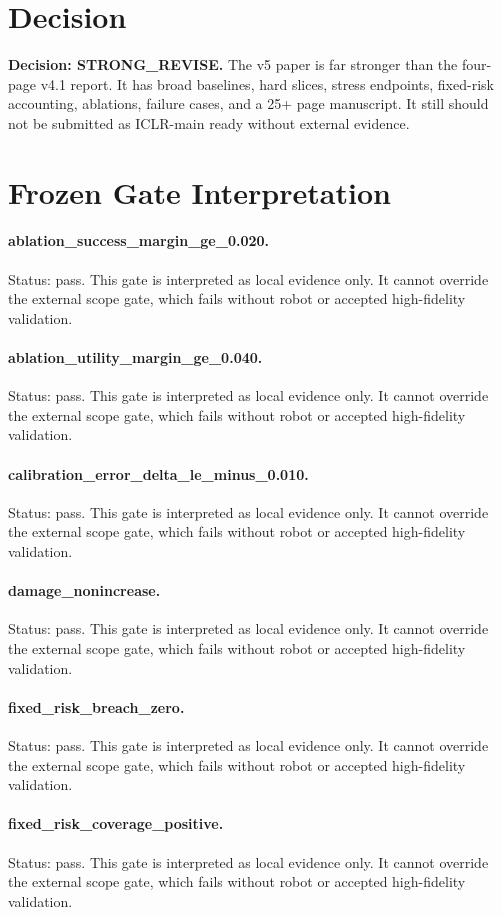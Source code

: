 \documentclass{article}
\begin{document}
\section{Decision}
\textbf{Decision: STRONG\_REVISE.} The v5 paper is far stronger than the four-page v4.1 report. It has broad baselines, hard slices, stress endpoints, fixed-risk accounting, ablations, failure cases, and a 25+ page manuscript. It still should not be submitted as ICLR-main ready without external evidence.
\clearpage
\appendix
\section{Frozen Gate Interpretation}
\paragraph{ablation\_success\_margin\_ge\_0.020.} Status: pass. This gate is interpreted as local evidence only. It cannot override the external scope gate, which fails without robot or accepted high-fidelity validation.
\paragraph{ablation\_utility\_margin\_ge\_0.040.} Status: pass. This gate is interpreted as local evidence only. It cannot override the external scope gate, which fails without robot or accepted high-fidelity validation.
\paragraph{calibration\_error\_delta\_le\_minus\_0.010.} Status: pass. This gate is interpreted as local evidence only. It cannot override the external scope gate, which fails without robot or accepted high-fidelity validation.
\paragraph{damage\_nonincrease.} Status: pass. This gate is interpreted as local evidence only. It cannot override the external scope gate, which fails without robot or accepted high-fidelity validation.
\paragraph{fixed\_risk\_breach\_zero.} Status: pass. This gate is interpreted as local evidence only. It cannot override the external scope gate, which fails without robot or accepted high-fidelity validation.
\paragraph{fixed\_risk\_coverage\_positive.} Status: pass. This gate is interpreted as local evidence only. It cannot override the external scope gate, which fails without robot or accepted high-fidelity validation.
\end{document}
